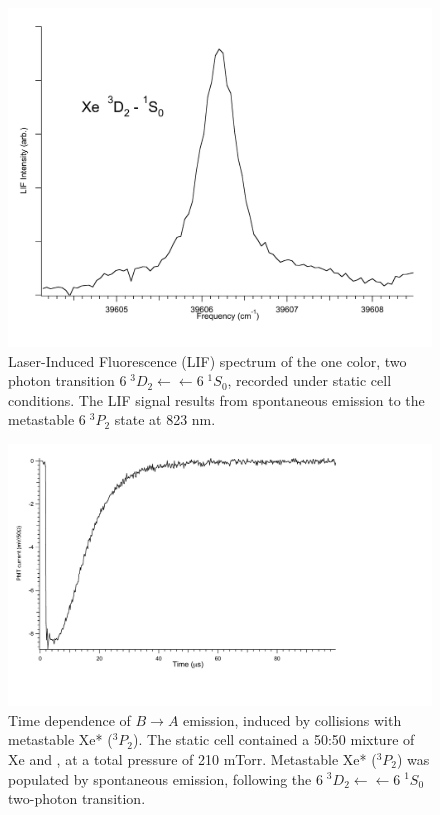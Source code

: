 \documentclass[12pt]{mitthesis}
\begin{document}
\begin{figure}
  \caption{Laser-Induced Fluorescence (LIF) spectrum of the one color,
    two photon transition  $6\;^3D_2 \leftarrow \leftarrow
    6\;^1S_0$, recorded under static cell conditions.  The LIF signal
    results from spontaneous emission to the metastable $6\;^3P_2$
    state at 823 nm.}
  \label{fig:xe3d2-cell}
  \centering
  \includegraphics[width=6in]{Xe3D2-cell.pdf}
\end{figure}

\begin{figure}
  \caption{Time dependence of  $B \rightarrow A$ emission,
    induced by collisions with metastable Xe* ($^3P_2$).  The static
    cell contained a 50:50 mixture of Xe and , at a total
    pressure of 210 mTorr.  Metastable Xe* ($^3P_2$) was populated by
    spontaneous emission, following the $6\;^3D_2 \leftarrow
    \leftarrow 6\;^1S_0$ two-photon transition.}
  \label{fig:xen2-firstlight}
  \centering
  \includegraphics[width=7in,trim=2cm 0 1in 0]{XeN2-firstlight.pdf}
\end{figure}
\end{document}
